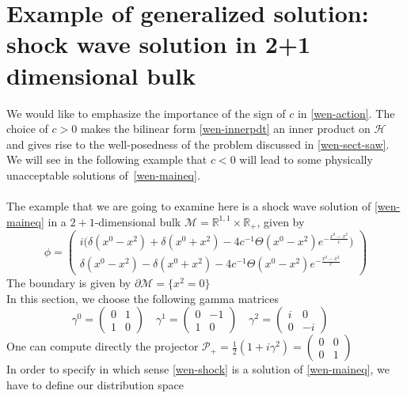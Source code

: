 \section{Example of generalized solution: shock wave solution in 2+1 dimensional bulk}
We would like to emphasize the importance of the sign of $c$ in \cref{wen-action}. 
The choice of $c>0$ makes the bilinear form \cref{wen-innerpdt} an inner product on $\mathcal{H}$ and gives rise to the well-posedness of the problem discussed in \cref{wen-sect-saw}.
We will see in the following example that $c < 0 $ will lead to some physically unacceptable solutions of~\cref{wen-maineq}. \\\\
The example that we are going to examine here is a shock wave solution of \cref{wen-maineq} in a $2+1$-dimensional bulk $\mathcal{M} = \mathbb{R}^{1,1}\times\mathbb{R}_+$, given by
\begin{equation}\label{wen-shock}
\phi = \begin{pmatrix}
i \big(\delta(x^0 - x^2) + \delta(x^0 + x^2) - 4c^{-1}\Theta(x^0-x^2)e^{- \frac{x^0-x^2}{c}} \big) \\
\delta({x^0 - x^2}) - \delta(x^0 + x^2) - 4c^{-1}\Theta(x^0-x^2)e^{- \frac{x^0-x^2}{c}} \end{pmatrix}
\end{equation}
The boundary is given by $\partial\mathcal{M} = \{x^2 = 0\}$ \\
In this section, we choose the following gamma matrices
\begin{equation*}
\gamma^0 = \begin{pmatrix} 0 & 1 \\ 1 &0 \end{pmatrix} \quad
\gamma^1 = \begin{pmatrix} 0 & -1 \\ 1 &0 \end{pmatrix} \quad
\gamma^2 = \begin{pmatrix} i & 0 \\ 0 &-i \end{pmatrix} \quad
\end{equation*}
One can compute directly the projector $\mathcal{P}_+ = \frac{1}{2}(1+i\gamma^2) 
= \begin{pmatrix}0 & 0 \\ 0 & 1 \end{pmatrix}$ \\
In order to specify in which sense \cref{wen-shock} is a solution of \cref{wen-maineq}, we have to define our distribution space
